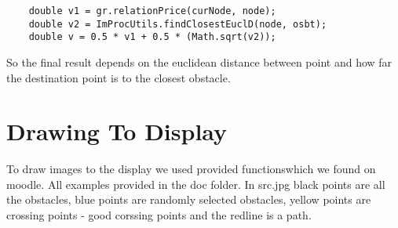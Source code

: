 \documentclass[12pt]{article}
\begin{document}
\begin{lstlisting}
    double v1 = gr.relationPrice(curNode, node);
    double v2 = ImProcUtils.findClosestEuclD(node, osbt);
    double v = 0.5 * v1 + 0.5 * (Math.sqrt(v2));
\end{lstlisting}

So the final result depends on the euclidean distance between point and how far the destination point is to the closest obstacle.

\section{Drawing To Display}

To draw images to the display we used provided functionswhich we found on moodle. All examples provided in the doc folder. In src.jpg black points are all the obstacles, blue points are randomly selected obstacles, yellow points are crossing points - good corssing points and the redline is a path.



\end{document}
